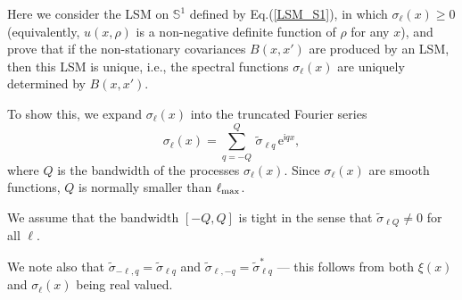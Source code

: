 \documentclass[12pt]{article}
\renewcommand{\S}{{\mathbb S}}
\newcommand{\ie}{i.e., }
\newcommand{\e}{\mathrm{e}}
\renewcommand{\i}{\mathsf{i}}
\begin{document}
Here we consider the LSM on $\S^1$ defined by Eq.(\ref{LSM_S1}), in which $\sigma_\ell(x)\ge 0$
(equivalently, $u(x,\rho)$ is a non-negative definite function of $\rho$ for any $x$), and prove that
if the non-stationary covariances $B(x,x')$ are produced by an LSM, then this LSM is unique, 
\ie  the spectral functions $\sigma_\ell(x)$ are uniquely determined by $B(x,x')$.

To show this, we  
expand  $\sigma_\ell(x)$ into the truncated Fourier series
%
\begin {equation}
\label{sigma_lq}
\sigma_\ell(x) = \sum_{q=-Q}^{Q}    
                          \,\widetilde\sigma_{\ell q} \, \e^{\i  q x},
\end {equation}
%
where $Q$ is the bandwidth of the processes $\sigma_\ell(x)$.
Since $\sigma_\ell(x)$ are smooth functions, $Q$ is normally smaller than $\ell_{\rm max}$.

We  assume that the bandwidth $[-Q,Q]$ is tight in the sense that  $\widetilde\sigma_{\ell Q} \ne 0$ for all $\ell$.

We note also that 
$\widetilde\sigma_{-\ell, q} = \widetilde\sigma_{\ell q}$ 
and $\widetilde\sigma_{\ell, -q} = \widetilde\sigma_{\ell q}^*$
--- this follows from  both  $\xi(x)$ and 
$\sigma_\ell(x)$ being real valued.
\end{document}

